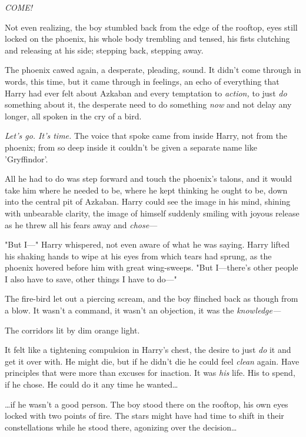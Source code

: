 \emph{COME!}

Not even realizing, the boy stumbled back from the edge of the rooftop, eyes 
still locked on the phoenix, his whole body trembling and tensed, his fists 
clutching and releasing at his side; stepping back, stepping away.

The phoenix cawed again, a desperate, pleading, sound. It didn't come through 
in words, this time, but it came through in feelings, an echo of everything 
that Harry had ever felt about Azkaban and every temptation to \emph{action,} 
to just \emph{do} something about it, the desperate need to do something 
\emph{now} and not delay any longer, all spoken in the cry of a bird.

\emph{Let's go. It's time.} The voice that spoke came from inside Harry, not 
from the phoenix; from so deep inside it couldn't be given a separate name like 
'Gryffindor'.

All he had to do was step forward and touch the phoenix's talons, and it would 
take him where he needed to be, where he kept thinking he ought to be, down 
into the central pit of Azkaban. Harry could see the image in his mind, shining 
with unbearable clarity, the image of himself suddenly smiling with joyous 
release as he threw all his fears away and \emph{chose}---

"But I---" Harry whispered, not even aware of what he was saying. Harry lifted 
his shaking hands to wipe at his eyes from which tears had sprung, as the 
phoenix hovered before him with great wing-sweeps. "But I---there's other 
people I also have to save, other things I have to do---"

The fire-bird let out a piercing scream, and the boy flinched back as though 
from a blow. It wasn't a command, it wasn't an objection, it was the 
\emph{knowledge---}

The corridors lit by dim orange light.

It felt like a tightening compulsion in Harry's chest, the desire to just 
\emph{do} it and get it over with. He might die, but if he didn't die he could 
feel \emph{clean} again. Have principles that were more than excuses for 
inaction. It was \emph{his} life. His to spend, if he chose. He could do it any 
time he wanted{\ldots}

{\ldots}if he wasn't a good person.
\sbreak
The boy stood there on the rooftop, his own eyes locked with two points of 
fire. The stars might have had time to shift in their constellations while he 
stood there, agonizing over the decision{\ldots}

